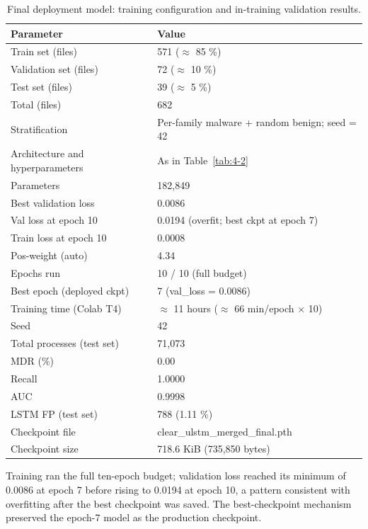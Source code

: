 \begin{table}[htbp]
\centering
\small
\caption{Final deployment model: training configuration and in-training validation results.}\label{tab:4-9}
\begin{tabularx}{\textwidth}{XX}
\hline
\textbf{Parameter} & \textbf{Value} \\
\hline
Train set (files) & 571 ($\approx$ 85 \%) \\
Validation set (files) & 72 ($\approx$ 10 \%) \\
Test set (files) & 39 ($\approx$ 5 \%) \\
Total (files) & 682 \\
Stratification & Per-family malware + random benign; seed = 42 \\
Architecture and hyperparameters & As in Table~\ref{tab:4-2} \\
Parameters & 182,849 \\
Best validation loss & 0.0086 \\
Val loss at epoch 10 & 0.0194 (overfit; best ckpt at epoch 7) \\
Train loss at epoch 10 & 0.0008 \\
Pos-weight (auto) & 4.34 \\
Epochs run & 10 /\allowbreak{} 10 (full budget) \\
Best epoch (deployed ckpt) & 7 (val\_\allowbreak{}loss = 0.0086) \\
Training time (Colab T4) & $\approx$ 11 hours ($\approx$ 66 min/\allowbreak{}epoch $\times$ 10) \\
Seed & 42 \\
Total processes (test set) & 71,073 \\
MDR (\%) & 0.00 \\
Recall & 1.0000 \\
AUC & 0.9998 \\
\textmu{}LSTM FP (test set) & 788 (1.11 \%) \\
Checkpoint file & clear\_\allowbreak{}ulstm\_\allowbreak{}merged\_\allowbreak{}final.pth \\
Checkpoint size & 718.6 KiB (735,850 bytes) \\
\hline
\end{tabularx}
\end{table}

Training ran the full ten-epoch budget; validation loss reached its minimum of 0.0086 at epoch 7 before rising to 0.0194 at epoch 10, a pattern consistent with overfitting after the best checkpoint was saved. The best-checkpoint mechanism preserved the epoch-7 model as the production checkpoint.

